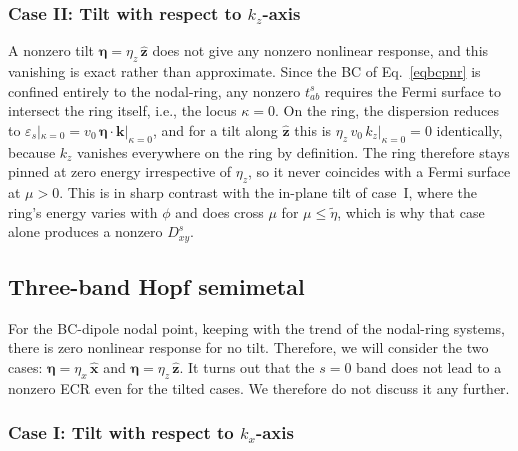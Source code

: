 \documentclass[aps,prb,onecolumn,nofootinbib,citeautoscript,10pt]{revtex4-2}
\newcommand{\bs}[1]{\boldsymbol{#1}}
\begin{document}
\subsubsection{Case II: Tilt with respect to $ k_z $-axis}

A nonzero tilt $ \bs \eta = \eta_z \,\bs{\hat z} $ does not give any nonzero nonlinear response, and this vanishing is exact rather than approximate. Since the BC of Eq.~\eqref{eqbcpnr} is confined entirely to the nodal-ring, any nonzero $t^s_{ab}$ requires the Fermi surface to intersect the ring itself, i.e., the locus $\kappa=0$. On the ring, the dispersion reduces to $\varepsilon_s|_{\kappa=0} = v_0\,\bs \eta \cdot \bs k|_{\kappa=0}$, and for a tilt along $\bs{\hat z}$ this is $\eta_z\, v_0 \, k_z|_{\kappa=0}=0$ identically, because $k_z$ vanishes everywhere on the ring by definition. The ring therefore stays pinned at zero energy irrespective of $\eta_z$, so it never coincides with a Fermi surface at $\mu>0$. This is in sharp contrast with the in-plane tilt of case~I, where the ring's energy varies with $\phi$ and does cross $\mu$ for $\mu \le \tilde \eta$, which is why that case alone produces a nonzero $D^s_{xy}$.




\subsection{Three-band Hopf semimetal}

For the BC-dipole nodal point, keeping with the trend of the nodal-ring systems, there is zero nonlinear response for no tilt. Therefore, we will consider the two cases: $\bs \eta = \eta_x \,\bs{\hat x} $ and $ \bs \eta = \eta_z \,\bs{\hat z} $. It turns out that the $s=0$ band does not lead to a nonzero ECR even for the tilted cases. We therefore do not discuss it any further.



\subsubsection{Case I: Tilt with respect to $ k_x $-axis}
\end{document}
